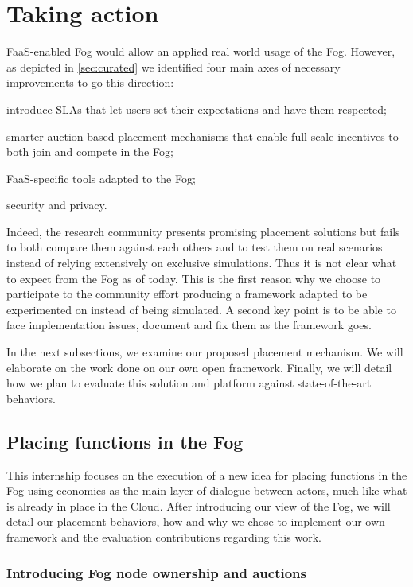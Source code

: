 \section{Taking action}
\label{sec:takingaction}

\gls{FaaS}-enabled Fog would allow an applied real world usage of the Fog. However, as depicted in \cref{sec:curated} we identified four main axes of necessary improvements to go this direction:
\begin{enumerate*}[(i)]
	\item introduce \glspl{SLA} that let users set their expectations and have them respected;
	\item smarter auction-based placement mechanisms that enable full-scale incentives to both join and compete in the Fog;
	\item \gls{FaaS}-specific tools adapted to the Fog;
	\item security and privacy.
\end{enumerate*}

Indeed, the research community presents promising placement solutions but fails to both compare them against each others and to test them on real scenarios instead of relying extensively on exclusive simulations. Thus it is not clear what to expect from the Fog as of today. This is the first reason why we choose to participate to the community effort producing a framework adapted to be experimented on instead of being simulated. A second key point is to be able to face implementation issues, document and fix them as the framework goes.

In the next subsections, we examine our proposed placement mechanism. We will elaborate on the work done on our own open framework. Finally, we will detail how we plan to evaluate this solution and platform against state-of-the-art behaviors.

\subsection{Placing functions in the Fog}

This internship focuses on the execution of a new idea for placing functions in the Fog using economics as the main layer of dialogue between actors, much like what is already in place in the Cloud. After introducing our view of the Fog, we will detail our placement behaviors, how and why we chose to implement our own framework and the evaluation contributions regarding this work.

\subsubsection{Introducing Fog node ownership and auctions}


